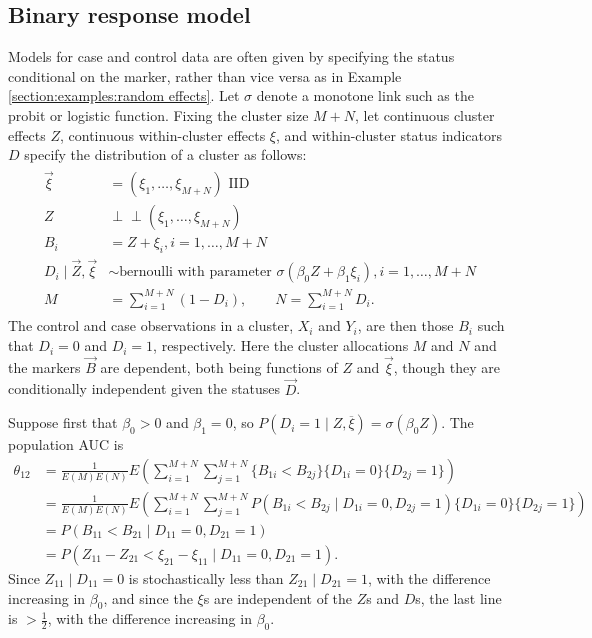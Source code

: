 \documentclass[12pt]{article}
\DeclareMathOperator{\AUC}{AUC}
\newcommand{\E}{E}
\renewcommand{\P}{P}
\newcommand{\cind}{\perp \!\!\! \perp}
\newcommand{\aucpop}{\theta_{12}}%
\begin{document}
\subsection{Binary response model}\label{section:examples:threshold}
Models for case and control data are often given by specifying the
status conditional on the marker, rather than vice versa as in
Example \ref{section:examples:random effects}. Let $\sigma$ denote a monotone link such as the probit or logistic function. Fixing the cluster size $M+N$, let continuous cluster
effects $Z$, continuous within-cluster effects $\xi$, and within-cluster
 status indicators $D$ specify the distribution of a cluster as follows:
\begin{gather}
  \begin{aligned}
    \vec{\xi}&=(\xi_1,\ldots,\xi_{M+N})\text{ IID}\\
    Z &\cind (\xi_1,\ldots,\xi_{M+N}) \\
    B_i &= Z+\xi_i,i=1,\ldots,M+N\\
    D_i \mid \vec{Z},\vec{\xi} &\sim \text{bernoulli with parameter } \sigma(\beta_0 Z+\beta_1\xi_i),i=1,\ldots,M+N\\
    M &= \sum_{i=1}^{M+N} (1-D_i),\qquad     N = \sum_{i=1}^{M+N} D_i.
    \label{model:logistic}
\end{aligned}
\end{gather}
The control and case observations in a cluster, $X_i$ and $Y_i$, are then those $B_i$ such that $D_i=0$ and $D_i=1$, respectively. Here the cluster allocations $M$ and $N$ and the markers $\vec{B}$ are dependent, both being functions of $Z$ and $\vec{\xi}$, though they are conditionally independent given the statuses $\vec{D}$.

Suppose first that $\beta_0>0$ and $\beta_1=0$, so $\P(D_i=1\mid  Z,\overline \xi)=\sigma(\beta_0 Z)$. The population AUC is
\begin{align}
  \aucpop &=\frac{1}{\E(M) \E (N)}\E\left(\sum_{i=1}^{M+N}\sum_{j=1}^{M+N}\{B_{1i}<B_{2j}\}\{D_{1i}=0\}\{D_{2j}=1\}\right)\\
	&=\frac{1}{\E (M) \E (N)}\E\left(\sum_{i=1}^{M+N}\sum_{j=1}^{M+N}\P(B_{1i}<B_{2j}\mid D_{1i}=0, D_{2j}=1)\{D_{1i}=0\}\{D_{2j}=1\}\right)\\
	&= \P(B_{11}<B_{21}\mid D_{11}=0, D_{21}=1)\\
	&=\P(Z_{11}-Z_{21} < \xi_{21}-\xi_{11}\mid D_{11}=0, D_{21}=1).
\end{align}
Since $Z_{11}\mid D_{11}=0$ is stochastically less than $Z_{21}\mid D_{21}=1$, with the difference increasing in $\beta_0$, and since the $\xi$s are independent of the $Z$s and $D$s, the last line is $>\frac12$, with the difference increasing in $\beta_0$.
\end{document}
